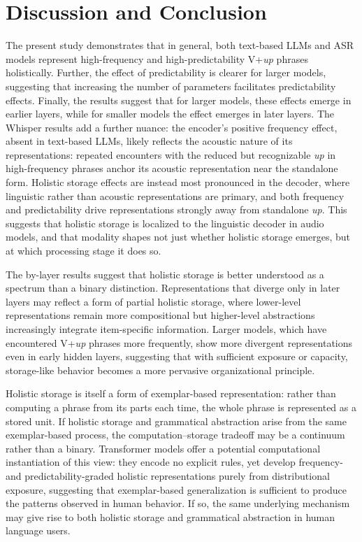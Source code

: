 \documentclass[11pt]{article}
\begin{document}
\section{Discussion and Conclusion}\label{discussion-and-conclusion}

The present study demonstrates that in general, both text-based LLMs and
ASR models represent high-frequency and high-predictability V+\emph{up}
phrases holistically. Further, the effect of predictability is clearer
for larger models, suggesting that increasing the number of parameters
facilitates predictability effects. Finally, the results suggest that
for larger models, these effects emerge in earlier layers, while for
smaller models the effect emerges in later layers. The Whisper results
add a further nuance: the encoder's positive frequency effect, absent in
text-based LLMs, likely reflects the acoustic nature of its
representations: repeated encounters with the reduced but recognizable
\emph{up} in high-frequency phrases anchor its acoustic representation
near the standalone form. Holistic storage effects are instead most
pronounced in the decoder, where linguistic rather than acoustic
representations are primary, and both frequency and predictability drive
representations strongly away from standalone \emph{up}. This suggests
that holistic storage is localized to the linguistic decoder in audio
models, and that modality shapes not just whether holistic storage
emerges, but at which processing stage it does so.

The by-layer results suggest that holistic storage is better understood
as a spectrum than a binary distinction. Representations that diverge
only in later layers may reflect a form of partial holistic storage,
where lower-level representations remain more compositional but
higher-level abstractions increasingly integrate item-specific
information. Larger models, which have encountered V+\emph{up} phrases
more frequently, show more divergent representations even in early
hidden layers, suggesting that with sufficient exposure or capacity,
storage-like behavior becomes a more pervasive organizational principle.

Holistic storage is itself a form of exemplar-based representation:
rather than computing a phrase from its parts each time, the whole
phrase is represented as a stored unit. If holistic storage and
grammatical abstraction arise from the same exemplar-based process, the
computation--storage tradeoff may be a continuum rather than a binary.
Transformer models offer a potential computational instantiation of this
view: they encode no explicit rules, yet develop frequency- and
predictability-graded holistic representations purely from
distributional exposure, suggesting that exemplar-based generalization
is sufficient to produce the patterns observed in human behavior. If so,
the same underlying mechanism may give rise to both holistic storage and
grammatical abstraction in human language users.
\end{document}
